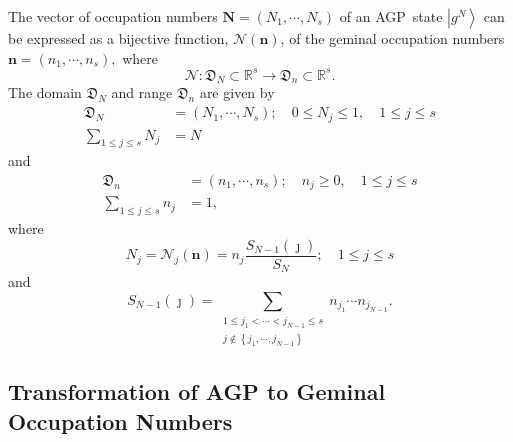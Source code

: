 \documentclass[aps,preprint]{revtex4}%
\begin{document}
The vector of occupation numbers $\mathbf{N}=\left(  N_{1},\cdots
,N_{s}\right)  $ of an AGP\ state $\left\vert g^{N}\right\rangle $ can be
expressed as a bijective function, $\mathcal{N}\left(  \mathbf{n}\right)  $,
of the geminal occupation numbers $\mathbf{n}=\left(  n_{1},\cdots
,n_{s}\right)  ,$ where
\begin{equation}
\mathcal{N}:\mathfrak{D}_{N}\subset\mathbb{R}^{s}\rightarrow\mathfrak{D}%
_{n}\subset\mathbb{R}^{s}.
\end{equation}
The domain $\mathfrak{D}_{N}$ and range $\mathfrak{D}_{n}$ are given by%
\begin{align}
\mathfrak{D}_{N}  &  =\left(  N_{1},\cdots,N_{s}\right)  ;\quad0\leq N_{j}%
\leq1,\quad1\leq j\leq s\nonumber\\
\sum_{1\leq j\leq s}N_{j}  &  =N
\end{align}
and
\begin{align}
\mathfrak{D}_{n}  &  =\left(  n_{1},\cdots,n_{s}\right)  ;\quad n_{j}%
\geq0,\quad1\leq j\leq s\nonumber\\
\sum_{1\leq j\leq s}n_{j}  &  =1,
\end{align}
where
\begin{equation}
N_{j}=\mathcal{N}_{j}\left(  \mathbf{n}\right)  =n_{j}\frac{S_{N-1}\left(
\jmath\right)  }{S_{N}};\quad1\leq j\leq s
\end{equation}
and
\begin{equation}
S_{N-1}\left(  \jmath\right)  =\sum_{\substack{1\leq j_{1}<\cdots<j_{N-1}\leq
s\\j\notin\left\{  j_{1},\cdots,j_{N-1}\right\}  }}n_{j_{1}}\cdots n_{j_{N-1}%
}.
\end{equation}


\subsection{Transformation of AGP to Geminal Occupation
Numbers\label{AGPoccGemocc}}
\end{document}
